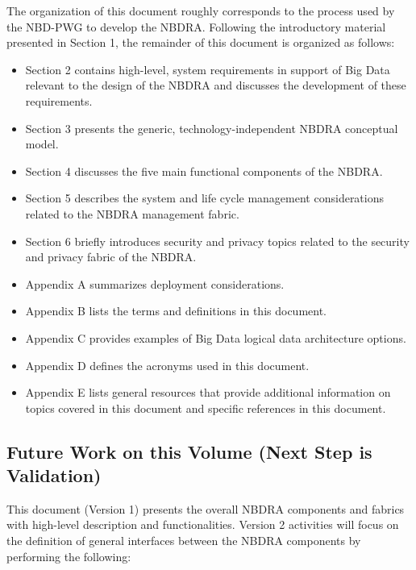 \documentclass[11pt]{article}
\begin{document}
The organization of this document roughly corresponds to the process used by the NBD-PWG to develop 
the NBDRA. Following the introductory material presented in Section 1, the remainder of this document 
is organized as follows: 

\begin{itemize}
\item	Section 2 contains high-level, system requirements in support of Big Data relevant to the design 
of the NBDRA and discusses the development of these requirements. 
\item	Section 3 presents the generic, technology-independent NBDRA conceptual model.
\item	Section 4 discusses the five main functional components of the NBDRA.
\item	Section 5 describes the system and life cycle management considerations related to the NBDRA 
management fabric.
\item	Section 6 briefly introduces security and privacy topics related to the security and privacy fabric 
of the NBDRA.
\item	Appendix A summarizes deployment considerations.
\item	Appendix B lists the terms and definitions in this document.
\item	Appendix C provides examples of Big Data logical data architecture options.
\item	Appendix D defines the acronyms used in this document.
\item	Appendix E lists general resources that provide additional information on topics covered in this 
document and specific references in this document.
\end{itemize}



\subsection{Future Work on this Volume (Next Step is Validation)}

This document (Version 1) presents the overall NBDRA components and fabrics with high-level 
description and functionalities. 
Version 2 activities will focus on the definition of general interfaces between the NBDRA components by 
performing the following:
\end{document}
